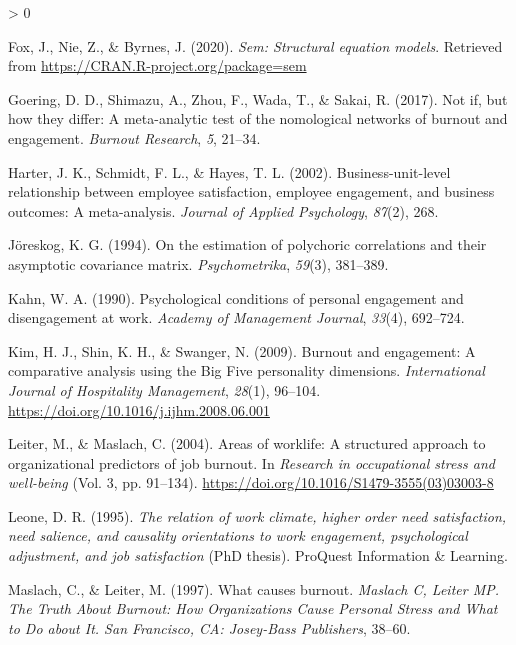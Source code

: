\documentclass[
  english,
  man]{apa6}
\newlength{\cslhangindent}
\newenvironment{CSLReferences}[2] %
 {%
  \setlength{\parindent}{0pt}
  \ifodd #1 \everypar{\setlength{\hangindent}{\cslhangindent}}\ignorespaces\fi
  \ifnum #2 > 0
  \setlength{\parskip}{#2\baselineskip}
  \fi
 }%
 {}
\begin{document}
\begin{CSLReferences}{1}{0}
\leavevmode\hypertarget{ref-R-sem}{}%
Fox, J., Nie, Z., \& Byrnes, J. (2020). \emph{Sem: Structural equation models}. Retrieved from \url{https://CRAN.R-project.org/package=sem}

\leavevmode\hypertarget{ref-goering2017not}{}%
Goering, D. D., Shimazu, A., Zhou, F., Wada, T., \& Sakai, R. (2017). Not if, but how they differ: A meta-analytic test of the nomological networks of burnout and engagement. \emph{Burnout Research}, \emph{5}, 21--34.

\leavevmode\hypertarget{ref-harter_business-unit-level_2002}{}%
Harter, J. K., Schmidt, F. L., \& Hayes, T. L. (2002). Business-unit-level relationship between employee satisfaction, employee engagement, and business outcomes: A meta-analysis. \emph{Journal of Applied Psychology}, \emph{87}(2), 268.

\leavevmode\hypertarget{ref-joreskog1994estimation}{}%
Jöreskog, K. G. (1994). On the estimation of polychoric correlations and their asymptotic covariance matrix. \emph{Psychometrika}, \emph{59}(3), 381--389.

\leavevmode\hypertarget{ref-kahn_psychological_1990}{}%
Kahn, W. A. (1990). Psychological conditions of personal engagement and disengagement at work. \emph{Academy of Management Journal}, \emph{33}(4), 692--724.

\leavevmode\hypertarget{ref-kim_burnout_2009}{}%
Kim, H. J., Shin, K. H., \& Swanger, N. (2009). Burnout and engagement: {A} comparative analysis using the {Big} {Five} personality dimensions. \emph{International Journal of Hospitality Management}, \emph{28}(1), 96--104. \url{https://doi.org/10.1016/j.ijhm.2008.06.001}

\leavevmode\hypertarget{ref-leiter_areas_2004}{}%
Leiter, M., \& Maslach, C. (2004). Areas of worklife: A structured approach to organizational predictors of job burnout. In \emph{Research in occupational stress and well-being} (Vol. 3, pp. 91--134). \url{https://doi.org/10.1016/S1479-3555(03)03003-8}

\leavevmode\hypertarget{ref-leone_relation_1995}{}%
Leone, D. R. (1995). \emph{The relation of work climate, higher order need satisfaction, need salience, and causality orientations to work engagement, psychological adjustment, and job satisfaction} (PhD thesis). ProQuest Information \& Learning.

\leavevmode\hypertarget{ref-maslach1997causes}{}%
Maslach, C., \& Leiter, M. (1997). What causes burnout. \emph{Maslach C, Leiter MP. The Truth About Burnout: How Organizations Cause Personal Stress and What to Do about It. San Francisco, CA: Josey-Bass Publishers}, 38--60.


\end{CSLReferences}
\end{document}
